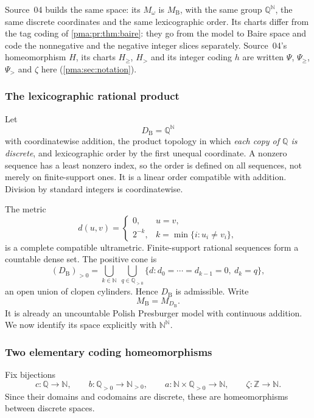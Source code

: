 \documentclass[11pt]{article}
\numberwithin{equation}{section}
\theoremstyle{definition}
\theoremstyle{remark}
\newcommand{\N}{\mathbb N}
\newcommand{\Z}{\mathbb Z}
\newcommand{\Q}{\mathbb Q}
\newcommand{\Baire}{\N^{\N}}
\newcommand{\MB}{M_{\mathrm B}}
\begin{document}
Source~04 builds the same space: its $M_\omega$ is $\MB$, with the same group
$\Q^{\N}$, the same discrete coordinates and the same lexicographic order. Its
charts differ from the tag coding of \cref{pma:pr:thm:baire}: they go from the
model to Baire space and code the nonnegative and the negative integer slices
separately. Source~04's homeomorphism $H$, its charts $H_{\ge}$, $H_{>}$ and
its integer coding $h$ are written $\Psi$, $\Psi_{\ge}$, $\Psi_{>}$ and
$\zeta$ here (\cref{pma:sec:notation}).

\subsubsection{The lexicographic rational product}

Let
\[
 D_{\mathrm B}=\Q^{\N}
\]
with coordinatewise addition, the product topology in which \emph{each copy
of $\Q$ is discrete}, and lexicographic order by the first unequal
coordinate. A nonzero sequence has a least nonzero index, so the order is
defined on all sequences, not merely on finite-support ones. It is a linear
order compatible with addition. Division by standard integers is
coordinatewise.

The metric
\[
 d(u,v)=
 \begin{cases}0,&u=v,\\2^{-k},&k=\min\{i:u_i\ne v_i\},\end{cases}
\]
is a complete compatible ultrametric. Finite-support rational sequences
form a countable dense set. The positive cone is
\[
 (D_{\mathrm B})_{>0}
 =\bigcup_{k\in\N}\ \bigcup_{q\in\Q_{>0}}
 \{d:d_0=\cdots=d_{k-1}=0,\ d_k=q\},
\]
an open union of clopen cylinders. Hence $D_{\mathrm B}$ is admissible.
Write
\[
 \MB=M_{D_{\mathrm B}}.
\]
It is already an uncountable Polish Presburger model with continuous
addition. We now identify its space explicitly with $\Baire$.

\subsubsection{Two elementary coding homeomorphisms}

Fix bijections
\[
 c:\Q\longrightarrow\N,\qquad
 b:\Q_{>0}\longrightarrow\N_{>0},\qquad
 a:\N\times\Q_{>0}\longrightarrow\N,
 \qquad \zeta:\Z\longrightarrow\N.
\]
Since their domains and codomains are discrete, these are homeomorphisms
between discrete spaces.
\end{document}
